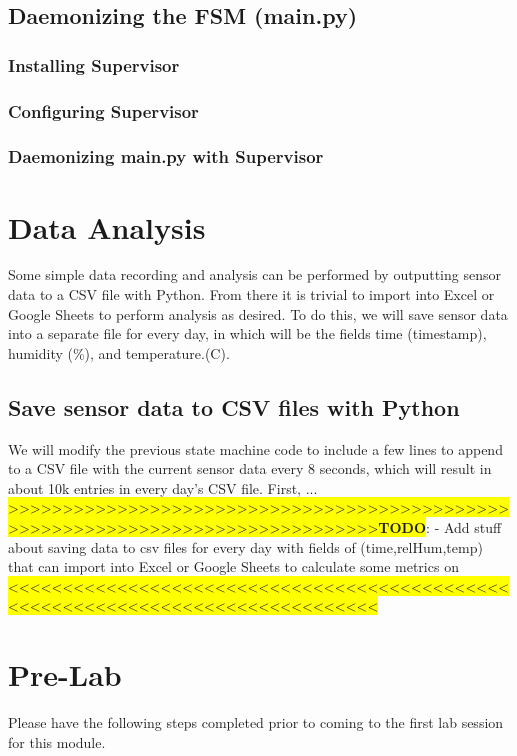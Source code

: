 \documentclass{article}
\newcommand{\todo}[1]{\newline\noindent\colorbox{Yellow}{>>>>>>>>>>>>>>>>>>>>>>>>>>>>>>>>>>>>>>>>>>>>>>>>>>>>>>>>>>>>>>>>>>>>>>>>>>>>>>>>}\newline\colorbox{Yellow}{\textbf{TODO}}: - #1 \newline \colorbox{Yellow}{<<<<<<<<<<<<<<<<<<<<<<<<<<<<<<<<<<<<<<<<<<<<<<<<<<<<<<<<<<<<<<<<<<<<<<<<<<<<<<<<}\newline}
\begin{document}
  \subsection{Daemonizing the FSM (main.py)}
    \subsubsection{Installing Supervisor}
    \subsubsection{Configuring Supervisor}
    \subsubsection{Daemonizing main.py with Supervisor}


\section{Data Analysis}
Some simple data recording and analysis can be performed by outputting sensor data to a CSV file with Python. From there it is trivial to import into Excel or Google Sheets to perform analysis as desired. To do this, we will save sensor data into a separate file for every day, in which will be the fields time (timestamp), humidity (\%), and temperature.(\degree C).
  \subsection{Save sensor data to CSV files with Python}
  We will modify the previous state machine code to include a few lines to append to a CSV file with the current sensor data every 8 seconds, which will result in about 10k entries in every day's CSV file. First, ...
  \todo{Add stuff about saving data to csv files for every day with fields of (time,relHum,temp) that can import into Excel or Google Sheets to calculate some metrics on}
\section{Pre-Lab}
  Please have the following steps completed prior to coming to the first lab session for this module.
\end{document}
